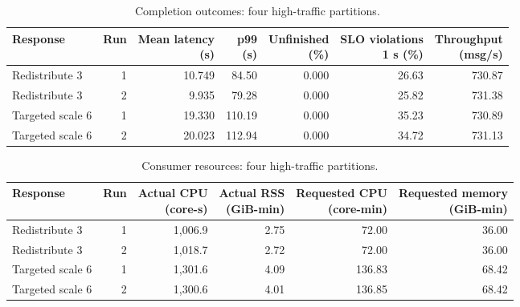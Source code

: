 \clearpage
\begingroup
\makeatletter
\setlength{\@fptop}{0pt}
\setlength{\@fpsep}{12pt}
\setlength{\@fpbot}{0pt plus 1fil}
\makeatother
\begin{table}[!htbp]
\centering\small
\setlength{\tabcolsep}{3pt}
\renewcommand{\arraystretch}{1.12}
\begin{tabular}{@{}lrrrrrr@{}}
\toprule
Response & Run & \shortstack{Mean latency\\(s)} & \shortstack{p99\\(s)} & \shortstack{Unfinished\\(\%)} & \shortstack{SLO violations\\1 s (\%)} & \shortstack{Throughput\\(msg/s)}\\
\midrule
Redistribute 3 & 1 & 10.749 & 84.50 & 0.000 & 26.63 & 730.87\\
Redistribute 3 & 2 & 9.935 & 79.28 & 0.000 & 25.82 & 731.38\\
Targeted scale 6 & 1 & 19.330 & 110.19 & 0.000 & 35.23 & 730.89\\
Targeted scale 6 & 2 & 20.023 & 112.94 & 0.000 & 34.72 & 731.13\\
\bottomrule
\end{tabular}
\caption{Completion outcomes: four high-traffic partitions.}
\label{tab:four-partition-outcomes}\label{tab:four-partition-latency-details}
\end{table}
\begin{table}[!htbp]
\centering\small
\setlength{\tabcolsep}{3pt}
\renewcommand{\arraystretch}{1.12}
\begin{tabular}{@{}lrrrrr@{}}
\toprule
Response & Run & \shortstack{Actual CPU\\(core-s)} & \shortstack{Actual RSS\\(GiB-min)} & \shortstack{Requested CPU\\(core-min)} & \shortstack{Requested memory\\(GiB-min)}\\
\midrule
Redistribute 3 & 1 & 1,006.9 & 2.75 & 72.00 & 36.00\\
Redistribute 3 & 2 & 1,018.7 & 2.72 & 72.00 & 36.00\\
Targeted scale 6 & 1 & 1,301.6 & 4.09 & 136.83 & 68.42\\
Targeted scale 6 & 2 & 1,300.6 & 4.01 & 136.85 & 68.42\\
\bottomrule
\end{tabular}
\caption{Consumer resources: four high-traffic partitions.}
\label{tab:four-partition-resources}
\end{table}
